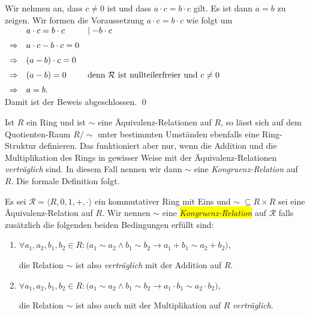 \proof
Wir nehmen an, dass $c \not = 0$ ist und dass $a \cdot c = b \cdot c$ gilt.  Es ist dann $a = b$ zu zeigen. 
Wir formen die Voraussetzung  $a \cdot c = b \cdot c$ wie folgt um
\\[0.2cm]
\hspace*{1.3cm}
$
\begin{array}[t]{cll}
            & a \cdot c = b \cdot c      & \mid - b \cdot c \\[0.2cm]
\Rightarrow & a \cdot c - b \cdot c  = 0                    \\[0.2cm]
\Rightarrow & (a - b) \cdot c = 0                           \\[0.2cm]
\Rightarrow & (a - b) = 0 & \mbox{denn $\mathcal{R}$ ist nullteilerfreier und $c \not= 0$} \\[0.2cm]
\Rightarrow & a = b.
\end{array}
$
\\[0.2cm]
Damit ist der Beweis abgeschlossen. \qed
\vspace*{0.2cm}

Ist $R$ ein Ring und ist $\sim$ eine \"{A}quivalenz-Relationen auf $R$,
so l\"{a}sst sich auf dem Quotienten-Raum $R/\!\sim$ unter bestimmten Umst\"{a}nden ebenfalls eine Ring-Struktur
definieren.   Das funktioniert aber nur, wenn die Addition und die Multiplikation des Rings in gewisser
Weise mit der \"{A}quivalenz-Relationen \emph{vertr\"{a}glich} sind.  In diesem Fall nennen wir dann $\sim$ eine
\emph{Kongruenz-Relation} auf $R$.  Die formale Definition folgt.

\begin{Definition}
Es sei $\mathcal{R} = \langle R, 0, 1, +, \cdot \rangle$ ein kommutativer Ring mit Eins und $\sim\; \subseteq R \times R$ sei eine
\"{A}quivalenz-Relation auf $R$.   Wir nennen $\sim$ eine \colorbox{yellow}{\emph{Kongruenz-Relation}} auf $\mathcal{R}$ 
falls zus\"{a}tzlich die folgenden beiden Bedingungen erf\"{u}llt sind:
\begin{enumerate}
\item $\forall a_1, a_2, b_1, b_2 \in R: 
       \bigl(a_1 \sim a_2 \wedge b_1 \sim b_2 \rightarrow a_1 + b_1 \sim a_2 + b_2\bigr)
      $,

      die Relation $\sim$ ist also \emph{vertr\"{a}glich} mit der Addition auf $R$.
\item $\forall a_1, a_2, b_1, b_2 \in R: 
       \bigl(a_1 \sim a_2 \wedge b_1 \sim b_2 \rightarrow a_1 \cdot b_1 \sim a_2 \cdot b_2\bigr)
      $,

      die Relation $\sim$ ist also auch mit der Multiplikation auf $R$ \emph{vertr\"{a}glich}.
      \eox
\end{enumerate}
\end{Definition}
  
